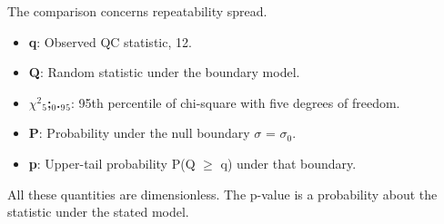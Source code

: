\documentclass[11pt,a4paper]{article}
\begin{document}
\begin{samepage}
The comparison concerns repeatability spread.

\begin{itemize}\setlength{\itemsep}{1pt}\setlength{\parsep}{0pt}
\item \textbf{q}: Observed QC statistic, 12.
\item \textbf{Q}: Random statistic under the boundary model.
\item \textbf{\ensuremath{\chi}\ensuremath{{}^2}\ensuremath{{}_5};\ensuremath{{}_0}.\ensuremath{{}_9}\ensuremath{{}_5}}: 95th percentile of chi-square with five degrees of freedom.
\item \textbf{P}: Probability under the null boundary \ensuremath{\sigma} = \ensuremath{\sigma}\ensuremath{{}_0}.
\item \textbf{p}: Upper-tail probability P(Q \ensuremath{\ge} q) under that boundary.
\end{itemize}

All these quantities are dimensionless. The p-value is a probability about the statistic under the stated model.

\end{samepage}
\medskip
\end{document}
